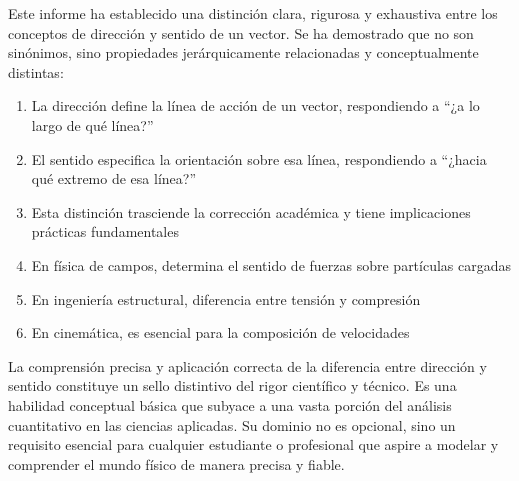 \documentclass[conference]{IEEEtran}
\begin{document}
Este informe ha establecido una distinción clara, rigurosa y exhaustiva entre los conceptos de dirección y sentido de un vector. Se ha demostrado que no son sinónimos, sino propiedades jerárquicamente relacionadas y conceptualmente distintas:

\begin{enumerate}
\item La dirección define la línea de acción de un vector, respondiendo a ``¿a lo largo de qué línea?''
\item El sentido especifica la orientación sobre esa línea, respondiendo a ``¿hacia qué extremo de esa línea?''
\item Esta distinción trasciende la corrección académica y tiene implicaciones prácticas fundamentales
\item En física de campos, determina el sentido de fuerzas sobre partículas cargadas
\item En ingeniería estructural, diferencia entre tensión y compresión
\item En cinemática, es esencial para la composición de velocidades
\end{enumerate}

La comprensión precisa y aplicación correcta de la diferencia entre dirección y sentido constituye un sello distintivo del rigor científico y técnico. Es una habilidad conceptual básica que subyace a una vasta porción del análisis cuantitativo en las ciencias aplicadas. Su dominio no es opcional, sino un requisito esencial para cualquier estudiante o profesional que aspire a modelar y comprender el mundo físico de manera precisa y fiable.
\end{document}
